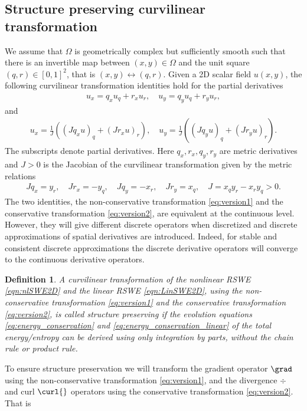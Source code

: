 \documentclass{article}
\numberwithin{equation}{section}
\newtheorem{definition}{Definition}
\theoremstyle{definition}
\begin{document}
\subsection{Structure preserving curvilinear transformation}
We assume that $\Omega$ is geometrically complex but sufficiently smooth such that there is an invertible map between $(x,y)\in \Omega$ and the unit square $(q,r)\in [0, 1]^2$, that is $(x,y) \leftrightarrow (q, r)$. Given a 2D scalar field $u(x,y)$, the  following curvilinear transformation identities hold for the partial derivatives
\begin{align}\label{eq:version1}
 u_x = q_x u_q + r_xu_r, \quad  u_y = q_y u_q + r_yu_r,
\end{align}
and
\begin{align}\label{eq:version2}
 u_x = \frac{1}{J} \left((Jq_x u)_q + (Jr_xu)_r\right), \quad  u_y = \frac{1}{J} \left((Jq_y u)_q + (Jr_yu)_r\right).
\end{align}
The subscripts denote partial derivatives. Here $q_x, r_x, q_y, r_y$ are metric derivatives and $J>0$ is the Jacobian of the curvilinear transformation given by the metric relations
\begin{align}
Jq_x = y_r, \quad Jr_x = -y_q, \quad Jq_y = -x_r, \quad Jr_y = x_q, \quad J = x_qy_r-x_ry_q >0.
\end{align}
The two identities, the non-conservative transformation \eqref{eq:version1} and the conservative transformation \eqref{eq:version2}, are equivalent at the continuous level.
However, they will give different discrete operators when discretized and discrete approximations of spatial derivatives are introduced.
Indeed, for  stable and consistent discrete approximations the  discrete derivative operators will converge to the continuous derivative operators.
\begin{definition}\label{def:structure-preserving}
    A curvilinear transformation of the nonlinear  RSWE \eqref{eqn:nlSWE2D} and the linear  RSWE \eqref{eqn:LinSWE2D}, using the non-conservative transformation \eqref{eq:version1} and the conservative transformation \eqref{eq:version2}, is called structure preserving if the evolution equations \eqref{eq:energy_conservation} and \eqref{eq:energy_conservation_linear} of the total energy/entropy can be derived using only integration by parts, without the chain rule or product rule.
\end{definition}
To ensure structure preservation we will transform the gradient operator $\grad$ using the non-conservative transformation \eqref{eq:version1}, and the divergence $\div{}$ and curl $\curl{}$  operators using the conservative transformation \eqref{eq:version2}. That is 
\end{document}
